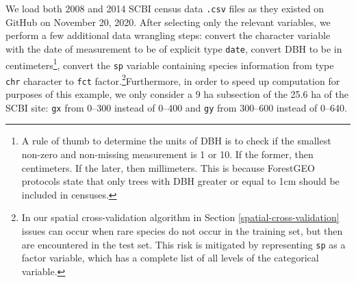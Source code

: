 \documentclass[12pt]{article}
\newenvironment{Shaded}{\begin{snugshade}}{\end{snugshade}}
\newcommand{\DataTypeTok}[1]{\textcolor[rgb]{0.13,0.29,0.53}{#1}}
\newcommand{\DecValTok}[1]{\textcolor[rgb]{0.00,0.00,0.81}{#1}}
\newcommand{\KeywordTok}[1]{\textcolor[rgb]{0.13,0.29,0.53}{\textbf{#1}}}
\newcommand{\NormalTok}[1]{#1}
\newcommand{\OperatorTok}[1]{\textcolor[rgb]{0.81,0.36,0.00}{\textbf{#1}}}
\newcommand{\StringTok}[1]{\textcolor[rgb]{0.31,0.60,0.02}{#1}}
\begin{document}
We load both 2008 and 2014 SCBI census data \texttt{.csv} files as they
existed on GitHub on November 20, 2020. After selecting only the
relevant variables, we perform a few additional data wrangling steps:
convert the character variable with the date of measurement to be of
explicit type \texttt{date}, convert DBH to be in centimeters\footnote{A
  rule of thumb to determine the units of DBH is to check if the
  smallest non-zero and non-missing measurement is 1 or 10. If the
  former, then centimeters. If the later, then millimeters. This is
  because ForestGEO protocols state that only trees with DBH greater or
  equal to 1cm should be included in censuses.}, convert the \texttt{sp}
variable containing species information from type \texttt{chr} character
to \texttt{fct} factor.\footnote{In our spatial cross-validation
  algorithm in Section \ref{spatial-cross-validation} issues can occur
  when rare species do not occur in the training set, but then are
  encountered in the test set. This risk is mitigated by representing
  \texttt{sp} as a factor variable, which has a complete list of all
  levels of the categorical variable.}Furthermore, in order to speed up
computation for purposes of this example, we only consider a 9 ha
subsection of the 25.6 ha of the SCBI site: \texttt{gx} from 0--300
instead of 0--400 and \texttt{gy} from 300--600 instead of 0--640.

\begin{Shaded}
\end{Shaded}
\end{document}
